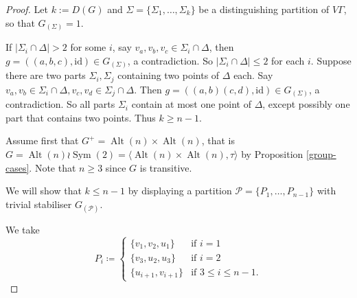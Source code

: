 \documentclass[11pt]{amsart}
\DeclareMathOperator{\Sym}{Sym}
\DeclareMathOperator{\Alt}{Alt}
\begin{document}
\begin{proof}

Let \(k:=D(G)\) and \(\Sigma=\{\Sigma_{1},\ldots, \Sigma_{k}\}\) be a distinguishing partition of \(V\Gamma\), so that \(G_{(\Sigma)}=1\).

If $|\Sigma_i\cap \Delta|> 2$ for some $i$, say $v_a,v_b,v_c\in \Sigma_i\cap \Delta$, then $g=((a,b,c),\mathrm{id})\in  G_{(\Sigma)}$, a contradiction.
So $|\Sigma_i\cap \Delta|\leqslant 2$ for each $i$.
Suppose there are two parts $\Sigma_i,\Sigma_j$ containing two points of $\Delta$ each. Say $v_a,v_b\in \Sigma_i\cap \Delta, v_c,v_d\in \Sigma_j\cap \Delta$. Then $g=((a,b)(c,d),\mathrm{id})\in  G_{(\Sigma)}$, a contradiction.
So all parts $\Sigma_i$ contain at most one point of $\Delta$, except possibly one part that contains two points. Thus $k\geqslant n-1$.


Assume first that $G^+=\Alt(n)\times \Alt(n)$, that is $G=\Alt(n)\wr \Sym(2)=\langle \Alt(n)\times \Alt(n),\tau\rangle$ by  Proposition \ref{group-cases}. Note that $n\geqslant 3$ since $G$ is transitive.


We will show that \(k\leqslant n-1\) by displaying a partition \(\mathcal{P}=\{P_1,\ldots, P_{n-1}\}\)  with trivial stabiliser \(G_{(\mathcal{P})}\). %

We take
\begin{equation*} 
P_{i}  \coloneqq
\begin{cases}
  \{v_1,v_2,u_1\}& \text{if } i=1\\ 
   \{v_3,u_2,u_3\}& \text{if } i=2\\ 
  \{u_{i+1},v_{i+1}\} & \text{if } 3\leqslant i\leqslant n-1.
\end{cases}
\end{equation*} 

% 


\end{proof}
\end{document}
